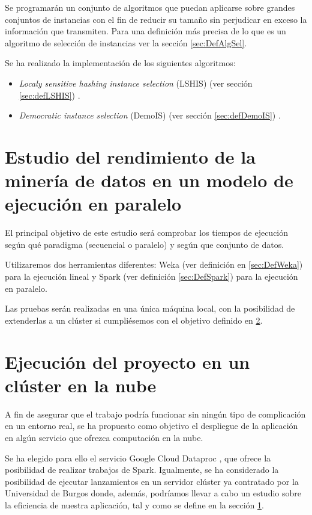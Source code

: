 Se programarán un conjunto de algoritmos que puedan aplicarse sobre grandes conjuntos de instancias con el fin de reducir su tamaño sin perjudicar en exceso la información que transmiten. Para una definición más precisa de lo que es un algoritmo de selección de instancias ver la sección \ref{sec:DefAlgSel}.

Se ha realizado la implementación de los siguientes algoritmos:

\begin{itemize}
	\item \textit{Localy sensitive hashing instance selection} (LSHIS) (ver sección \ref{sec:defLSHIS}) \cite{LSHISPaper}.
	\item \textit{Democratic instance selection} (DemoIS) (ver sección \ref{sec:defDemoIS}) \cite{DemoISPaper}.
\end{itemize}


\section{Estudio del rendimiento de la minería de datos en un modelo de ejecución en paralelo}\label{sec:estudio}

El principal objetivo de este estudio será comprobar los tiempos de ejecución según qué paradigma (secuencial o paralelo) y según que conjunto de datos.

Utilizaremos dos herramientas diferentes: Weka (ver definición en \ref{sec:DefWeka}) para la ejecución lineal y Spark (ver definición \ref{sec:DefSpark}) para la ejecución en paralelo.

Las pruebas serán realizadas en una única máquina local, con la posibilidad de extenderlas a un clúster si cumpliésemos con el objetivo definido en \ref{sec:ejecucionNube}.

\section{Ejecución del proyecto en un clúster en la nube}\label{sec:ejecucionNube}

A fin de asegurar que el trabajo podría funcionar sin ningún tipo de complicación en un entorno real, se ha propuesto como objetivo el despliegue de la aplicación en algún servicio que ofrezca computación en la nube.

Se ha elegido para ello el servicio Google Cloud Dataproc \cite{dataprocSoft}, que ofrece la posibilidad de realizar trabajos de Spark. Igualmente, se ha considerado la posibilidad de ejecutar lanzamientos en un servidor clúster ya contratado por la Universidad de Burgos donde, además, podríamos llevar a cabo un estudio sobre la eficiencia de nuestra aplicación, tal y como se define en la sección \ref{sec:estudio}.


